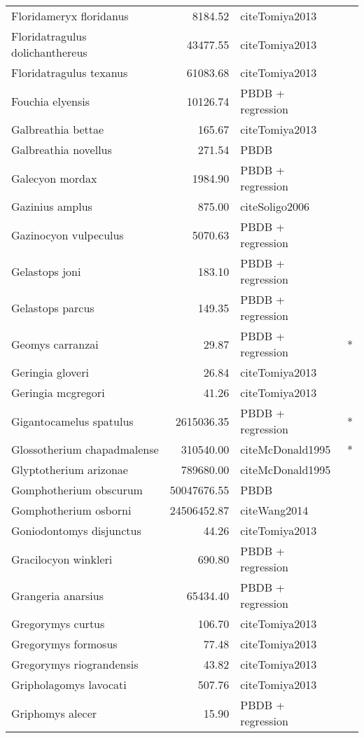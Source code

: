 \begin{table}[ht]
\begin{tabular}{lrll}
  Floridameryx floridanus & 8184.52 & cite{Tomiya2013} &  \\ 
  Floridatragulus dolichanthereus & 43477.55 & cite{Tomiya2013} &  \\ 
  Floridatragulus texanus & 61083.68 & cite{Tomiya2013} &  \\ 
  Fouchia elyensis & 10126.74 & PBDB + regression &  \\ 
  Galbreathia bettae & 165.67 & cite{Tomiya2013} &  \\ 
  Galbreathia novellus & 271.54 & PBDB &  \\ 
  Galecyon mordax & 1984.90 & PBDB + regression &  \\ 
  Gazinius amplus & 875.00 & cite{Soligo2006} &  \\ 
  Gazinocyon vulpeculus & 5070.63 & PBDB + regression &  \\ 
  Gelastops joni & 183.10 & PBDB + regression &  \\ 
  Gelastops parcus & 149.35 & PBDB + regression &  \\ 
  Geomys carranzai & 29.87 & PBDB + regression & * \\ 
  Geringia gloveri & 26.84 & cite{Tomiya2013} &  \\ 
  Geringia mcgregori & 41.26 & cite{Tomiya2013} &  \\ 
  Gigantocamelus spatulus & 2615036.35 & PBDB + regression & * \\ 
  Glossotherium chapadmalense & 310540.00 & cite{McDonald1995} & * \\ 
  Glyptotherium arizonae & 789680.00 & cite{McDonald1995} &  \\ 
  Gomphotherium obscurum & 50047676.55 & PBDB &  \\ 
  Gomphotherium osborni & 24506452.87 & cite{Wang2014} &  \\ 
  Goniodontomys disjunctus & 44.26 & cite{Tomiya2013} &  \\ 
  Gracilocyon winkleri & 690.80 & PBDB + regression &  \\ 
  Grangeria anarsius & 65434.40 & PBDB + regression &  \\ 
  Gregorymys curtus & 106.70 & cite{Tomiya2013} &  \\ 
  Gregorymys formosus & 77.48 & cite{Tomiya2013} &  \\ 
  Gregorymys riograndensis & 43.82 & cite{Tomiya2013} &  \\ 
  Gripholagomys lavocati & 507.76 & cite{Tomiya2013} &  \\ 
  Griphomys alecer & 15.90 & PBDB + regression &  \\ 

\end{tabular}
\end{table}
